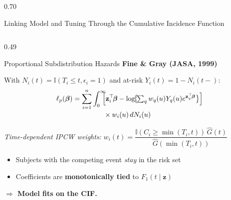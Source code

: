 \documentclass[final]{beamer}
\begin{document}
\begin{frame}[t]
\begin{columns}[t, onlytextwidth]
\begin{column}{0.70\textwidth}
\begin{block}{Linking Model and Tuning Through the Cumulative Incidence Function}
\vspace{0.4cm}

\begin{columns}[T]

\begin{column}{0.49\textwidth}
\begin{block}{Proportional Subdistribution Hazards}
\textbf{Fine \& Gray (JASA, 1999)}
\begin{tcolorbox}[colback=red!5!white, colframe=red!75!black,
                  title=Partial Pseudo Log-Likelihood]
With $N_i(t)=\mathbb{I}(T_i\le t,\epsilon_i=1)$ and at-risk $Y_i(t)=1-N_i(t-)$:
\vspace{-0.4em}
\begin{align*}
\ell_p(\boldsymbol\beta) = \sum_{i=1}^n \int_0^{\infty} \!\!&\!
  \Bigl[\mathbf{z}_i^\top\!\boldsymbol\beta -
   \log\!\bigl\{\!\textstyle\sum_q w_q(u)Y_q(u)e^{\mathbf{z}_q^\top\!\boldsymbol\beta}\bigr\}\Bigr] \\[-2pt]
  &\times w_i(u)\,dN_i(u)
\end{align*}
\vspace{-0.6em}

\noindent\textit{Time-dependent IPCW weights:}\;
$w_i(t)=\dfrac{\mathbb{I}(C_i \ge \min(T_i,t))\,\hat{G}(t)}{\hat{G}(\min(T_i,t))}$
\end{tcolorbox}
\begin{itemize}
  \item Subjects with the competing event \emph{stay} in the risk set
  \item Coefficients are \textbf{monotonically tied} to $F_1(t\mid\mathbf{z})$
\end{itemize}
\textbf{$\Rightarrow$ Model fits on the CIF.}
\end{block}
\end{column}


\end{columns}
\end{block}
\end{column}
\end{columns}
\end{frame}
\end{document}
